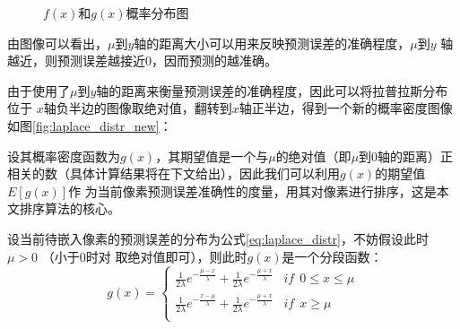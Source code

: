 \begin{figure}[!h]
\centering 
{}
\caption{$f(x)$和$g(x)$概率分布图}
\label{fig:laplace_distr}
\end{figure}
\par
由图像可以看出，$\mu$到$y$轴的距离大小可以用来反映预测误差的准确程度，$\mu$到$y$
轴越近，则预测误差越接近0，因而预测的越准确。
\par
由于使用了$\mu$到$y$轴的距离来衡量预测误差的准确程度，因此可以将拉普拉斯分布位于
$x$轴负半边的图像取绝对值，翻转到$x$轴正半边，得到一个新的概率密度图像如图\ref{fig:laplace_distr_new}：
\par
设其概率密度函数为$g(x)$，其期望值是一个与$\mu$的绝对值（即$\mu$到0轴的距离）正
相关的数（具体计算结果将在下文给出），因此我们可以利用$g(x)$的期望值$E[g(x)]$作
为当前像素预测误差准确性的度量，用其对像素进行排序，这是本文排序算法的核心。
\par
设当前待嵌入像素的预测误差的分布为公式\ref{eq:laplace_distr}，不妨假设此时$\mu>0$
（小于0时对 取绝对值即可），则此时$g(x)$是一个分段函数：
\begin{equation}
  g(x)=\left\{ \begin{array}{ll}
    \frac{1}{2\lambda}e^{-\frac{\mu-x}{\lambda}}+\frac{1}{2\lambda}e^{-\frac{\mu+x}{\lambda}} &
    if~~0\le x\le\mu\\
    \frac{1}{2\lambda}e^{-\frac{x-\mu}{\lambda}}+\frac{1}{2\lambda}e^{-\frac{\mu+x}{\lambda}} &
    if~~x\ge\mu\\
  \end{array} \right.
  \label{eq:second_pe_embedding}
\end{equation}
